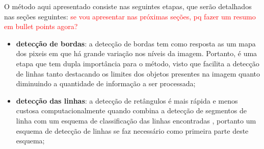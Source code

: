 
O método aqui apresentado consiste nas seguintes etapas, que serão detalhados nas seções seguintes: \textcolor{red}{se vou apresentar nas próximas seções, pq fazer um resumo em bullet points agora?}

\begin{itemize}
 \item \textbf{detecção de bordas}: a detecção de bordas tem como resposta as um mapa dos pixeis em que há grande variação nos níveis da imagem. Portanto, é uma etapa que tem dupla importância para o método, visto que facilita a detecção de linhas tanto destacando os limites dos objetos presentes na imagem quanto diminuindo a quantidade de informação a ser processada;
\item \textbf{detecção das linhas}: a detecção de retângulos é mais rápida e menos custosa computacionalmente quando combina a detecção de segmentos de linha com um esquema de classificação das linhas encontradas \cite{mrf}, portanto um esquema de detecção de linhas se faz necessário como primeira parte deste esquema;%


\end{itemize}
